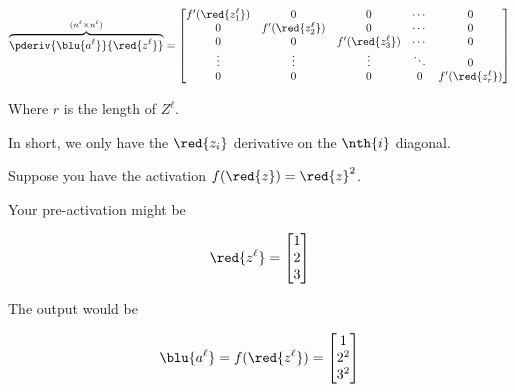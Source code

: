 \begin{notation}
            \begin{equation*}
                \overbrace{
                    \pderiv {\blu{a^\ell}}   {\red{z^\ell}}
                }^{ (n^{\ell} \times n^{\ell}) }
                =
                \begin{bmatrix}
                    f'({\red{z_1^\ell}})&0                   &0                   &\cdots  & 0 \\
                    0                   &f'({\red{z_2^\ell}})&0                   &\cdots  & 0 \\
                    0                   &0                   &f'({\red{z_3^\ell}})&\cdots  & 0 \\
                    \vdots              &\vdots              &\vdots              &\ddots  & 0 \\
                    0                   &0                   &0                   &0   &f'({\red{z_r^\ell}})
                \end{bmatrix}
            \end{equation*}
            
            Where $r$ is the length of $Z^\ell$.
        \end{notation}
        
        
        
        In short, we only have the $\red{z_i}$ derivative on the $\nth{i}$ diagonal.
        
        \miniex Suppose you have the activation $f(\red{z}) = \red{z}^2$.
        
        Your pre-activation might be 
        
        \begin{equation}
            \red{z^\ell} = 
            \begin{bmatrix}
                1 \\ 2 \\ 3
            \end{bmatrix}
        \end{equation}
        
        The output would be 
        
        \begin{equation}
            \blu{a^\ell} 
            = 
            f(\red{z^\ell})
            = 
            \begin{bmatrix}
                1 \\ 2^2 \\ 3^2
            \end{bmatrix}
        \end{equation}
        

